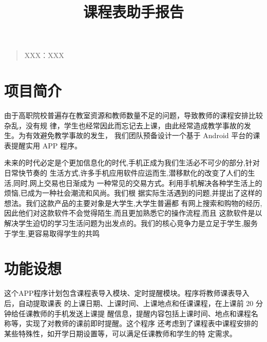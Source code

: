 \documentclass[12pt]{article}
\begin{document}
\begin{titlepage}

  \title{ \fontsize{45}{17} 课程表助手报告 }
  \date{}
  \maketitle

  \linewidth
  \begin{quotation}

    \Large \bf
    \par\setlength\parindent{8em}
    \quad

    XXX：\quad XXX \quad

  \end{quotation}
\end{titlepage}
  
\tableofcontents
  
\pagebreak
  
\section{项目简介}

由于高职院校普遍存在教室资源和教师数量不足的问题，导致教师的课程安排比较杂乱，没有规
律，学生也经常因此而忘记去上课，由此经常造成教学事故的发生。为有效避免教学事故的发生，
我们团队预备设计一个基于 Android 平台的课表提醒实用 APP 程序。

未来的时代必定是个更加信息化的时代,手机正成为我们生活必不可少的部分,针对日常快节奏的
生活方式,许多手机应用软件应运而生,潜移默化的改变了人们的生活,同时,网上交易也日渐成为
一种常见的交易方式。利用手机解决各种学生活上的烦恼,已成为一种社会潮流和风尚。我们根
据实际生活遇到的问题,并提出了这样的想法。我们这款产品的主要对象是大学生,大学生普遍都
有网上搜索和购物的经历,因此他们对这款软件不会觉得陌生,而且更加熟悉它的操作流程,而且
这款软件是以解决学生迫切的学习生活问题为出发点的。我们的核心竞争力是立足于学生,服务
于学生,更容易取得学生的共鸣

\section{功能设想}

这个APP程序计划包含课程表导入模块、定时提醒模块。程序将教师课表导入后，自动提取课表
的上课日期、上课时间、上课地点和任课课程，在上课前 20 分钟给任课教师的手机发送上课提
醒信息，提醒内容包括上课时间、地点和课程名称等，实现了对教师的课前即时提醒。这个程序
还考虑到了课程表中课程安排的某些特殊性，如开学日期设置等，可以满足任课教师和学生的特
定需求。
\end{document}
